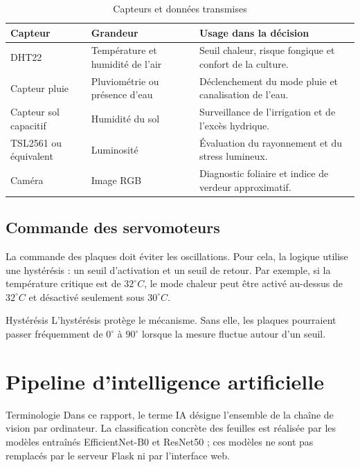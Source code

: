﻿\documentclass[11pt,a4paper,openany]{report}
\begin{document}
\begin{table}[H]
\centering
\renewcommand{\arraystretch}{1.35}

\begin{tabular}{|p{3cm}|p{3.2cm}|p{7.2cm}|}
\hline
\textbf{Capteur} & \textbf{Grandeur} & \textbf{Usage dans la décision} \\
\hline

DHT22 &
Température et humidité de l'air &
Seuil chaleur, risque fongique et confort de la culture. \\
\hline

Capteur pluie &
Pluviométrie ou présence d'eau &
Déclenchement du mode pluie et canalisation de l'eau. \\
\hline

Capteur sol capacitif &
Humidité du sol &
Surveillance de l'irrigation et de l'excès hydrique. \\
\hline

TSL2561 ou équivalent &
Luminosité &
Évaluation du rayonnement et du stress lumineux. \\
\hline

Caméra &
Image RGB &
Diagnostic foliaire et indice de verdeur approximatif. \\
\hline

\end{tabular}

\caption{Capteurs et données transmises}
\label{tab:capteurs}
\end{table}

\section{Commande des servomoteurs}
La commande des plaques doit éviter les oscillations. Pour cela, la logique utilise une hystérésis : un seuil d'activation et un seuil de retour. Par exemple, si la température critique est de \(32^\circ C\), le mode chaleur peut être activé au-dessus de \(32^\circ C\) et désactivé seulement sous \(30^\circ C\).

\begin{importantbox}{Hystérésis}
L'hystérésis protège le mécanisme. Sans elle, les plaques pourraient passer fréquemment de \(0^\circ\) à \(90^\circ\) lorsque la mesure fluctue autour d'un seuil.
\end{importantbox}

\chapter{Pipeline d'intelligence artificielle}
\begin{importantbox}{Terminologie}
Dans ce rapport, le terme IA désigne l'ensemble de la chaîne de vision par ordinateur. La classification concrète des feuilles est réalisée par les modèles entraînés EfficientNet-B0 et ResNet50 ; ces modèles ne sont pas remplacés par le serveur Flask ni par l'interface web.
\end{importantbox}
\end{document}

